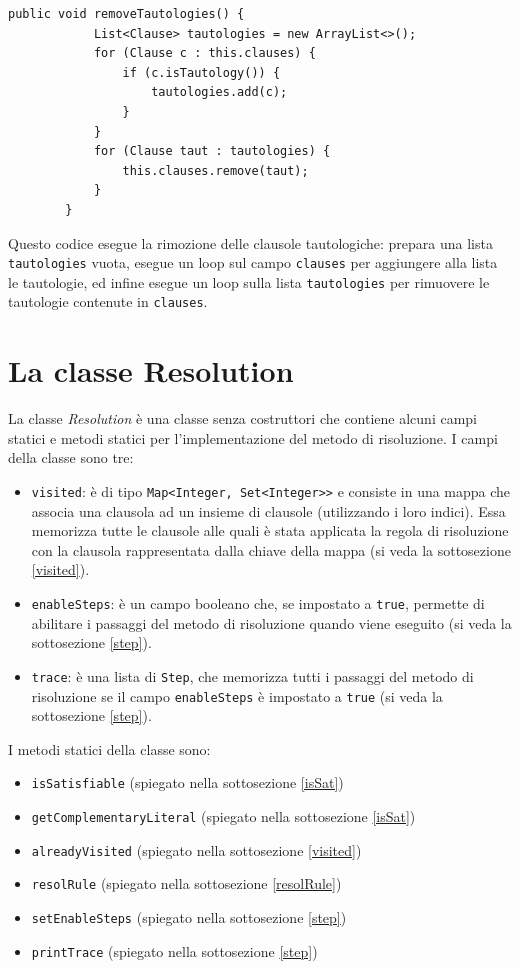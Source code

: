 \documentclass[a4paper,12pt]{report}
\begin{document}
\begin{minipage}{\linewidth}
    \small
    \begin{lstlisting}[caption={Metodo ``removeTautologies'' della classe ClauseSet}, label={remtaut}]
        public void removeTautologies() {
            List<Clause> tautologies = new ArrayList<>();
            for (Clause c : this.clauses) {
                if (c.isTautology()) {
                    tautologies.add(c);
                }
            }
            for (Clause taut : tautologies) {
                this.clauses.remove(taut);
            }
        }
    \end{lstlisting}
\end{minipage}
Questo codice esegue la rimozione delle clausole tautologiche: prepara una lista \texttt{tautologies} vuota, esegue un loop sul campo \texttt{clauses} per aggiungere alla lista le tautologie, ed infine esegue un loop sulla lista \texttt{tautologies} per rimuovere le tautologie contenute in \texttt{clauses}.

\section{La classe Resolution}
\label{class:Resolution}
La classe \emph{Resolution} è una classe senza costruttori che contiene alcuni campi statici e metodi statici per l'implementazione del metodo di risoluzione. I campi della classe sono tre:
\begin{itemize}
    \item \texttt{visited}: è di tipo \texttt{Map<Integer, Set<Integer>>} e consiste in una mappa che associa una clausola ad un insieme di clausole (utilizzando i loro indici). Essa memorizza tutte le clausole alle quali è stata applicata la regola di risoluzione con la clausola rappresentata dalla chiave della mappa (si veda la sottosezione \ref{visited}).
    \item \texttt{enableSteps}: è un campo booleano che, se impostato a \texttt{true}, permette di abilitare i passaggi del metodo di risoluzione quando viene eseguito (si veda la sottosezione \ref{step}).
    \item \texttt{trace}: è una lista di \texttt{Step}, che memorizza tutti i passaggi del metodo di risoluzione se il campo \texttt{enableSteps} è impostato a \texttt{true} (si veda la sottosezione \ref{step}).
\end{itemize}

I metodi statici della classe sono:
\begin{itemize}
    \item \texttt{isSatisfiable} (spiegato nella sottosezione \ref{isSat})
    \item \texttt{getComplementaryLiteral} (spiegato nella sottosezione \ref{isSat})
    \item \texttt{alreadyVisited} (spiegato nella sottosezione \ref{visited})
    \item \texttt{resolRule} (spiegato nella sottosezione \ref{resolRule})
    \item \texttt{setEnableSteps} (spiegato nella sottosezione \ref{step})
    \item \texttt{printTrace} (spiegato nella sottosezione \ref{step})
\end{itemize}
\end{document}
